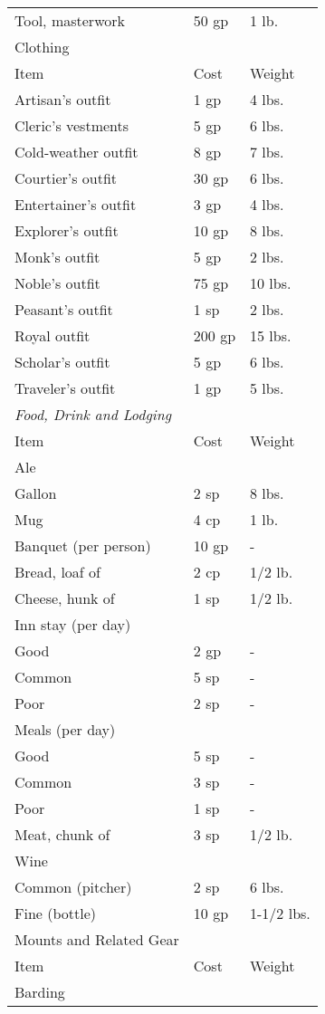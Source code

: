 \begin{table*}[]
\begin{tabular}{lll}
 Tool, masterwork & 50 gp & 1 lb.\\
Clothing \\
 Item & Cost & Weight\\
Artisan's outfit & 1 gp & 4 lbs. \\
 Cleric's vestments & 5 gp & 6 lbs. \\
 Cold-weather outfit & 8 gp & 7 lbs. \\
 Courtier's outfit & 30 gp & 6 lbs. \\
 Entertainer's outfit & 3 gp & 4 lbs. \\
 Explorer's outfit & 10 gp & 8 lbs. \\
 Monk's outfit & 5 gp & 2 lbs. \\
 Noble's outfit & 75 gp & 10 lbs. \\
 Peasant's outfit & 1 sp & 2 lbs. \\
 Royal outfit & 200 gp & 15 lbs. \\
 Scholar's outfit & 5 gp & 6 lbs. \\
 Traveler's outfit & 1 gp & 5 lbs.\\
\textit{Food, Drink and Lodging}  \\
 Item & Cost & Weight\\
Ale  \\
 Gallon & 2 sp & 8 lbs. \\
 Mug & 4 cp & 1 lb. \\
 Banquet (per person) & 10 gp & - \\
 Bread, loaf of & 2 cp & 1/2 lb. \\
 Cheese, hunk of & 1 sp & 1/2 lb. \\
 Inn stay (per day)  \\
 Good & 2 gp & - \\
 Common & 5 sp & - \\
 Poor & 2 sp & - \\
 Meals (per day)  \\
 Good & 5 sp & - \\
 Common & 3 sp & - \\
 Poor & 1 sp & - \\
 Meat, chunk of & 3 sp & 1/2 lb. \\
 Wine  \\
 Common (pitcher) & 2 sp & 6 lbs. \\
 Fine (bottle) & 10 gp & 1-1/2 lbs.\\
Mounts and Related Gear  \\
 Item & Cost & Weight\\
Barding  \\

\end{tabular}
\end{table*}
